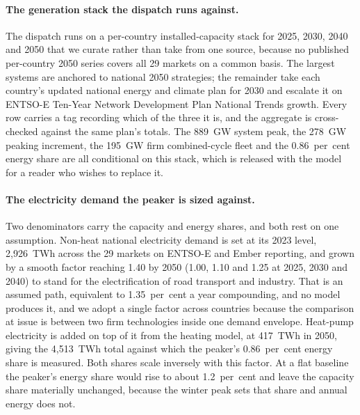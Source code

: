 \paragraph{The generation stack the dispatch runs against.} The dispatch runs on a
per-country installed-capacity stack for 2025, 2030, 2040 and 2050 that we curate rather
than take from one source, because no published per-country 2050 series covers all 29
markets on a common basis. The largest systems are anchored to national 2050 strategies;
the remainder take each country's updated national energy and climate plan for 2030 and
escalate it on ENTSO-E Ten-Year Network Development Plan National Trends growth. Every
row carries a tag recording which of the three it is, and the aggregate is cross-checked
against the same plan's totals. The 889~GW system peak, the 278~GW peaking increment, the
195~GW firm combined-cycle fleet and the 0.86~per~cent energy share are all conditional on
this stack, which is released with the model for a reader who wishes to replace it.

\paragraph{The electricity demand the peaker is sized against.} Two denominators carry
the capacity and energy shares, and both rest on one assumption. Non-heat national electricity demand is set at its 2023 level, 2{,}926~TWh across
the 29 markets on ENTSO-E and Ember reporting, and grown by a smooth factor reaching
1.40 by 2050 (1.00, 1.10 and 1.25 at 2025, 2030 and 2040) to stand for the
electrification of road transport and industry. That is an assumed path, equivalent to
1.35~per~cent a year compounding, and no model produces it, and we adopt a single factor
across countries because the comparison at issue is between two firm technologies inside one demand envelope. Heat-pump electricity is added
on top of it from the heating model, at 417~TWh in 2050, giving the 4{,}513~TWh total
against which the peaker's 0.86~per~cent energy share is measured. Both shares scale
inversely with this factor. At a flat baseline the peaker's energy share would rise to about 1.2~per~cent and leave
the capacity share materially unchanged, because the winter peak sets that share and
annual energy does not.

